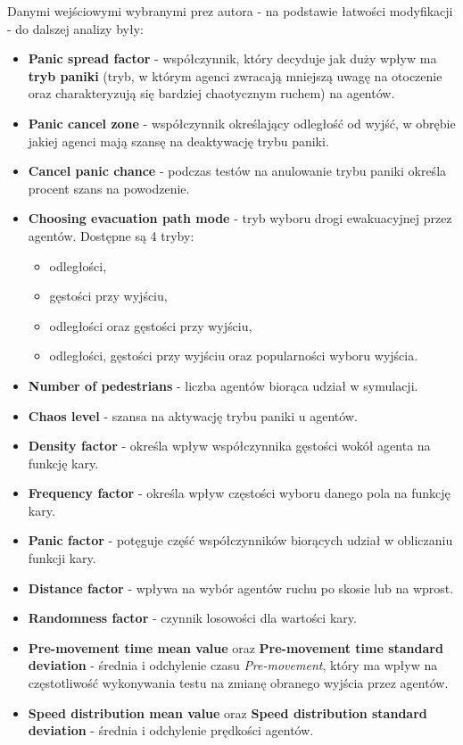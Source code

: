 \documentclass[12pt]{aghdpl}
\begin{document}
		Danymi wejściowymi wybranymi prez autora - na podstawie łatwości modyfikacji - do dalszej analizy były:\label{dane_do_dalszej_analizy}
		
		\begin{itemize}
		\item \textbf{Panic spread factor} - współczynnik, który decyduje jak duży wpływ ma \textbf{tryb paniki} (tryb, w którym agenci zwracają mniejszą uwagę na otoczenie oraz charakteryzują się bardziej chaotycznym ruchem) na agentów.
		\item \textbf{Panic cancel zone} - współczynnik określający odległość od wyjść, w obrębie jakiej agenci mają szansę na deaktywację trybu paniki.
		\item \textbf{Cancel panic chance} - podczas testów na anulowanie trybu paniki określa procent szans na powodzenie.
		\item \textbf{Choosing evacuation path mode} - tryb wyboru drogi ewakuacyjnej przez agentów. Dostępne są 4 tryby:
			\begin{itemize}
			\item odległości,
			\item gęstości przy wyjściu,
			\item odległości oraz gęstości przy wyjściu,
			\item odległości, gęstości przy wyjściu oraz popularności wyboru wyjścia.
			\end{itemize}
		\item \textbf{Number of pedestrians} - liczba agentów biorąca udział w symulacji.
		\item \textbf{Chaos level} - szansa na aktywację trybu paniki u agentów.
		\item \textbf{Density factor} - określa wpływ współczynnika gęstości wokół agenta na funkcję kary.
		\item \textbf{Frequency factor} - określa wpływ częstości wyboru danego pola na funkcję kary.
		\item \textbf{Panic factor} - potęguje część współczynników biorących udział w obliczaniu funkcji kary. 
		\item \textbf{Distance factor} - wpływa na wybór agentów ruchu po skosie lub na wprost.
		\item \textbf{Randomness factor} - czynnik losowości dla wartości kary.
		\item \textbf{Pre-movement time mean value} oraz \textbf{Pre-movement time standard deviation} - średnia i odchylenie czasu \textit{Pre-movement}, który ma wpływ na częstotliwość wykonywania testu na zmianę obranego wyjścia przez agentów.
		\item \textbf{Speed distribution mean value} oraz \textbf{Speed distribution standard deviation} - średnia i odchylenie prędkości agentów.
		\end{itemize}
		
\end{document}
